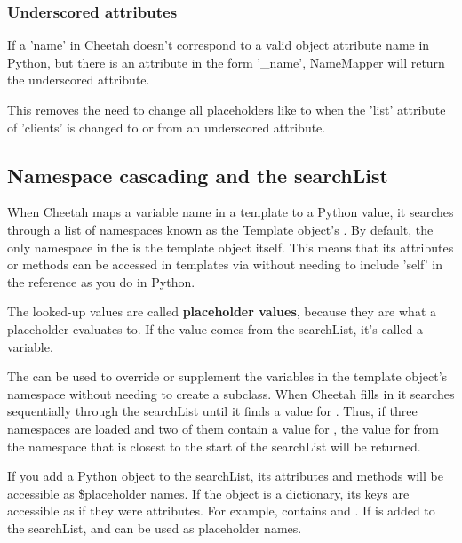 \subsubsection{Underscored attributes}
\label{language.namemapper.underscore}

If a 'name' in Cheetah doesn't correspond to a valid object attribute name in
Python, but there is an attribute in the form '\_name', NameMapper will return
the underscored attribute.

This removes the need to change all placeholders like  to
 when the 'list' attribute of 'clients' is changed to or
from an underscored attribute.


\subsection{Namespace cascading and the searchList}
\label{language.searchList}

When Cheetah maps a variable name in a template to a Python value, it searches
through a list of namespaces known as the Template object's .
By default, the only namespace in the  is the template object
itself. This means that its attributes or methods can be accessed in templates
via  without needing to include 'self' in the reference as
you do in Python. 

The looked-up values are called {\bf placeholder values}, because they are what
a placeholder evaluates to.  If the value comes from the searchList, it's called
a  variable.

The  can be used to override or supplement the variables in the
template object's namespace without needing to create a subclass.  When Cheetah
fills in  it searches sequentially through the searchList until it
finds a value for .  Thus, if three namespaces are loaded and two of
them contain a value for , the value for  from the
namespace that is closest to the start of the searchList will be returned.

If you add a Python object to the searchList, its attributes and methods will
be accessible as \$placeholder names.  If the object is a dictionary, its keys
are accessible as if they were attributes.  For example, 
contains  and .  If  is added to
the searchList,  and  can be used as
placeholder names.

